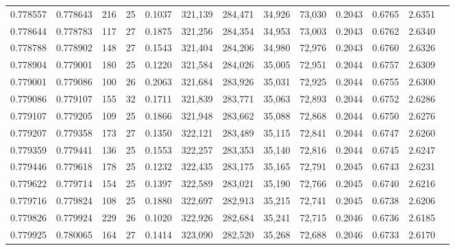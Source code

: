 \begin{tabular}{rrrrrrrrrrrrr}
0.778557 & 0.778643 &   216 &  25 &                                     0.1037 & 321,139 & 284,471 &  34,926 &  73,030 & 0.2043 & 0.6765 & 2.6351 \\
0.778644 & 0.778783 &   117 &  27 &                                     0.1875 & 321,256 & 284,354 &  34,953 &  73,003 & 0.2043 & 0.6762 & 2.6340 \\
0.778788 & 0.778902 &   148 &  27 &                                     0.1543 & 321,404 & 284,206 &  34,980 &  72,976 & 0.2043 & 0.6760 & 2.6326 \\
0.778904 & 0.779001 &   180 &  25 &                                     0.1220 & 321,584 & 284,026 &  35,005 &  72,951 & 0.2044 & 0.6757 & 2.6309 \\
0.779001 & 0.779086 &   100 &  26 &                                     0.2063 & 321,684 & 283,926 &  35,031 &  72,925 & 0.2044 & 0.6755 & 2.6300 \\
0.779086 & 0.779107 &   155 &  32 &                                     0.1711 & 321,839 & 283,771 &  35,063 &  72,893 & 0.2044 & 0.6752 & 2.6286 \\
0.779107 & 0.779205 &   109 &  25 &                                     0.1866 & 321,948 & 283,662 &  35,088 &  72,868 & 0.2044 & 0.6750 & 2.6276 \\
0.779207 & 0.779358 &   173 &  27 &                                     0.1350 & 322,121 & 283,489 &  35,115 &  72,841 & 0.2044 & 0.6747 & 2.6260 \\
0.779359 & 0.779441 &   136 &  25 &                                     0.1553 & 322,257 & 283,353 &  35,140 &  72,816 & 0.2044 & 0.6745 & 2.6247 \\
0.779446 & 0.779618 &   178 &  25 &                                     0.1232 & 322,435 & 283,175 &  35,165 &  72,791 & 0.2045 & 0.6743 & 2.6231 \\
0.779622 & 0.779714 &   154 &  25 &                                     0.1397 & 322,589 & 283,021 &  35,190 &  72,766 & 0.2045 & 0.6740 & 2.6216 \\
0.779716 & 0.779824 &   108 &  25 &                                     0.1880 & 322,697 & 282,913 &  35,215 &  72,741 & 0.2045 & 0.6738 & 2.6206 \\
0.779826 & 0.779924 &   229 &  26 &                                     0.1020 & 322,926 & 282,684 &  35,241 &  72,715 & 0.2046 & 0.6736 & 2.6185 \\
0.779925 & 0.780065 &   164 &  27 &                                     0.1414 & 323,090 & 282,520 &  35,268 &  72,688 & 0.2046 & 0.6733 & 2.6170 \\

\end{tabular}
